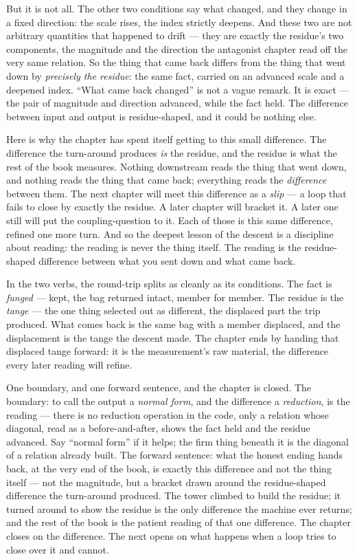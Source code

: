 But it is not all. The other two conditions say what changed, and they change in a fixed direction: the scale rises,
the index strictly deepens. And these two are not arbitrary quantities that happened to drift --- they are exactly the
residue's two components, the magnitude and the direction the antagonist chapter read off the very same relation. So
the thing that came back differs from the thing that went down by \emph{precisely the residue}: the same fact, carried
on an advanced scale and a deepened index. ``What came back changed'' is not a vague remark. It is exact --- the pair
of magnitude and direction advanced, while the fact held. The difference between input and output is residue-shaped,
and it could be nothing else.

Here is why the chapter has spent itself getting to this small difference. The difference the turn-around produces
\emph{is} the residue, and the residue is what the rest of the book measures. Nothing downstream reads the thing that
went down, and nothing reads the thing that came back; everything reads the \emph{difference} between them. The next
chapter will meet this difference as a \emph{slip} --- a loop that fails to close by exactly the residue. A later
chapter will bracket it. A later one still will put the coupling-question to it. Each of those is this same difference,
refined one more turn. And so the deepest lesson of the descent is a discipline about reading: the reading is never the
thing itself. The reading is the residue-shaped difference between what you sent down and what came back.

In the two verbs, the round-trip splits as cleanly as its conditions. The fact is \emph{funged} --- kept, the bag
returned intact, member for member. The residue is the \emph{tange} --- the one thing selected out as different, the
displaced part the trip produced. What comes back is the same bag with a member displaced, and the displacement is the
tange the descent made. The chapter ends by handing that displaced tange forward: it is the measurement's raw
material, the difference every later reading will refine.

One boundary, and one forward sentence, and the chapter is closed. The boundary: to call the output a \emph{normal
form}, and the difference a \emph{reduction}, is the reading --- there is no reduction operation in the code, only a
relation whose diagonal, read as a before-and-after, shows the fact held and the residue advanced. Say ``normal form''
if it helps; the firm thing beneath it is the diagonal of a relation already built. The forward sentence: what the
honest ending hands back, at the very end of the book, is exactly this difference and not the thing itself --- not the
magnitude, but a bracket drawn around the residue-shaped difference the turn-around produced. The tower climbed to
build the residue; it turned around to show the residue is the only difference the machine ever returns; and the rest
of the book is the patient reading of that one difference. The chapter closes on the difference. The next opens on what
happens when a loop tries to close over it and cannot.
